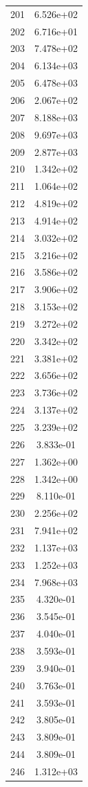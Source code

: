 \documentclass[12pt]{article}
\begin{document}
\begin{longtable}{@{}cc@{}}
201 & 6.526e+02 \\
202 & 6.716e+01 \\
203 & 7.478e+02 \\
204 & 6.134e+03 \\
205 & 6.478e+03 \\
206 & 2.067e+02 \\
207 & 8.188e+03 \\
208 & 9.697e+03 \\
209 & 2.877e+03 \\
210 & 1.342e+02 \\
211 & 1.064e+02 \\
212 & 4.819e+02 \\
213 & 4.914e+02 \\
214 & 3.032e+02 \\
215 & 3.216e+02 \\
216 & 3.586e+02 \\
217 & 3.906e+02 \\
218 & 3.153e+02 \\
219 & 3.272e+02 \\
220 & 3.342e+02 \\
221 & 3.381e+02 \\
222 & 3.656e+02 \\
223 & 3.736e+02 \\
224 & 3.137e+02 \\
225 & 3.239e+02 \\
226 & 3.833e-01 \\
227 & 1.362e+00 \\
228 & 1.342e+00 \\
229 & 8.110e-01 \\
230 & 2.256e+02 \\
231 & 7.941e+02 \\
232 & 1.137e+03 \\
233 & 1.252e+03 \\
234 & 7.968e+03 \\
235 & 4.320e-01 \\
236 & 3.545e-01 \\
237 & 4.040e-01 \\
238 & 3.593e-01 \\
239 & 3.940e-01 \\
240 & 3.763e-01 \\
241 & 3.593e-01 \\
242 & 3.805e-01 \\
243 & 3.809e-01 \\
244 & 3.809e-01 \\
246 & 1.312e+03 \\

\end{longtable}
\end{document}
